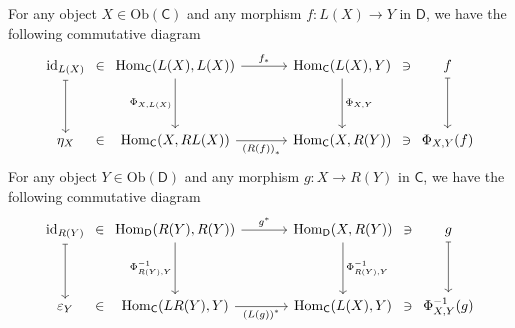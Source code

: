 \begin{prf}
    For any object $X\in \mathrm{Ob}(\mathsf{C})$ and any morphism $f:L(X)\to Y$ in $\mathsf{D}$, we have the following commutative diagram
    \[
		\begin{tikzcd}[ampersand replacement=\&, row sep = 3.5em]
			\mathrm{id}_{L(X)}\arrow[d, mapsto]\&[-25pt]\in\&[-25pt]\mathrm{Hom}_{\mathsf{C}}(L(X),L(X)) \arrow[d, "{\Phi_{X,L(X)}}"']  \arrow[rr, "{f_*}"] \&[-15pt] \& {\mathrm{Hom}_{\mathsf{C}}(L(X),Y)}\arrow[d, "\Phi_{X,Y}"]\&[-25pt]\ni\&[-25pt]f \arrow[d, mapsto]\\
			\eta_X\&\in\&{\mathrm{Hom}_{\mathsf{C}}(X,RL(X))} \arrow[rr, "{\left(R(f)\right)_*}"'] \&  \& {\mathrm{Hom}_{\mathsf{C}}(X,R(Y))}  \&\ni\& \Phi_{X,Y}(f)     
		\end{tikzcd}
	\]
    For any object $Y\in \mathrm{Ob}(\mathsf{D})$ and any morphism $g:X\to R(Y)$ in $\mathsf{C}$, we have the following commutative diagram
    \[
        \begin{tikzcd}[ampersand replacement=\&, row sep = 3.5em]
            \mathrm{id}_{R(Y)}\arrow[d, mapsto]\&[-25pt]\in\&[-25pt]\mathrm{Hom}_{\mathsf{D}}(R(Y),R(Y)) \arrow[d, "{\Phi_{R(Y),Y}^{-1}}"']  \arrow[rr, "{g^*}"] \&[-15pt] \& {\mathrm{Hom}_{\mathsf{D}}(X,R(Y))}\arrow[d, "\Phi_{R(Y),Y}^{-1}"]\&[-25pt]\ni\&[-25pt]g \arrow[d, mapsto]\\
            \varepsilon_Y\&\in\&{\mathrm{Hom}_{\mathsf{C}}(LR(Y),Y)} \arrow[rr, "{\left(L(g)\right)^*}"'] \&  \& {\mathrm{Hom}_{\mathsf{C}}(L(X),Y)}  \&\ni\& \Phi_{X,Y}^{-1}(g)
        \end{tikzcd}
    \]
\end{prf}

